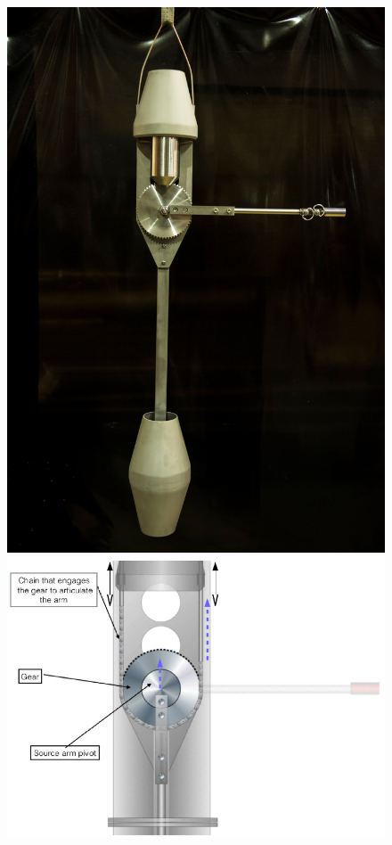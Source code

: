\begin{figure}[htbp]
 \centering
\begin{minipage}[b]{0.48\textwidth}
\centering
  \includegraphics[width=\textwidth]{Figures/SourcePod2_mirrored.jpg}
\end{minipage}
\begin{minipage}[b]{0.48\textwidth}
\centering
  \includegraphics[width=\textwidth]{Figures/sourceArmArticulation.png}

\end{minipage}
\end{figure}
